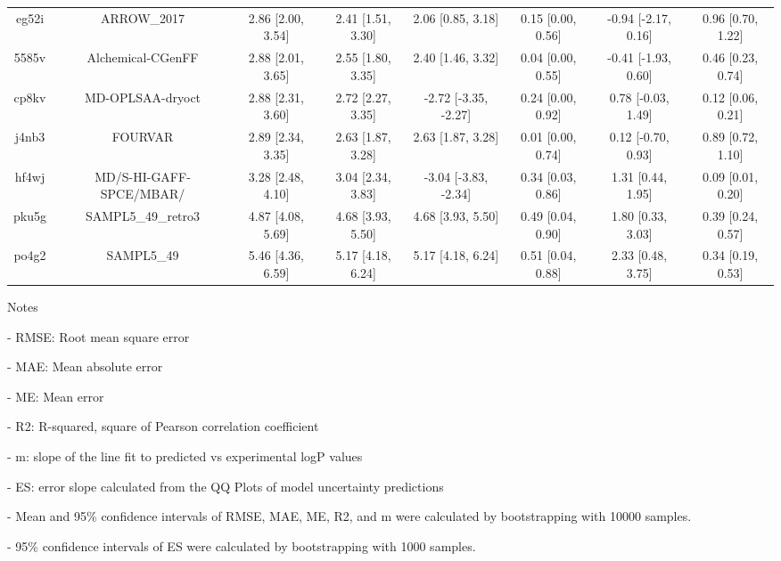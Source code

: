 \documentclass{article}
\begin{document}
\begin{center}
\begin{longtable}{|cccccccc|}
 eg52i &                                        ARROW\_2017 &  2.86 [2.00, 3.54] &  2.41 [1.51, 3.30] &     2.06 [0.85, 3.18] &  0.15 [0.00, 0.56] &  -0.94 [-2.17, 0.16] &     0.96 [0.70, 1.22] \\
 5585v &                                  Alchemical-CGenFF &  2.88 [2.01, 3.65] &  2.55 [1.80, 3.35] &     2.40 [1.46, 3.32] &  0.04 [0.00, 0.55] &  -0.41 [-1.93, 0.60] &     0.46 [0.23, 0.74] \\
 cp8kv &                                   MD-OPLSAA-dryoct &  2.88 [2.31, 3.60] &  2.72 [2.27, 3.35] &  -2.72 [-3.35, -2.27] &  0.24 [0.00, 0.92] &   0.78 [-0.03, 1.49] &     0.12 [0.06, 0.21] \\
 j4nb3 &                                            FOURVAR &  2.89 [2.34, 3.35] &  2.63 [1.87, 3.28] &     2.63 [1.87, 3.28] &  0.01 [0.00, 0.74] &   0.12 [-0.70, 0.93] &     0.89 [0.72, 1.10] \\
 hf4wj &                            MD/S-HI-GAFF-SPCE/MBAR/ &  3.28 [2.48, 4.10] &  3.04 [2.34, 3.83] &  -3.04 [-3.83, -2.34] &  0.34 [0.03, 0.86] &    1.31 [0.44, 1.95] &     0.09 [0.01, 0.20] \\
 pku5g &                                 SAMPL5\_49\_retro3 &  4.87 [4.08, 5.69] &  4.68 [3.93, 5.50] &     4.68 [3.93, 5.50] &  0.49 [0.04, 0.90] &    1.80 [0.33, 3.03] &     0.39 [0.24, 0.57] \\
 po4g2 &                                         SAMPL5\_49 &  5.46 [4.36, 6.59] &  5.17 [4.18, 6.24] &     5.17 [4.18, 6.24] &  0.51 [0.04, 0.88] &    2.33 [0.48, 3.75] &     0.34 [0.19, 0.53] \\
\end{longtable}
\end{center}

Notes

- RMSE: Root mean square error

- MAE: Mean absolute error

- ME: Mean error

- R2: R-squared, square of Pearson correlation coefficient

- m: slope of the line fit to predicted vs experimental logP values

- ES: error slope calculated from the QQ Plots of model uncertainty predictions

- Mean and 95\% confidence intervals of RMSE, MAE, ME, R2, and m were calculated by bootstrapping with 10000 samples.

- 95\% confidence intervals of ES were calculated by bootstrapping with 1000 samples.\end{document}
\end{document}

